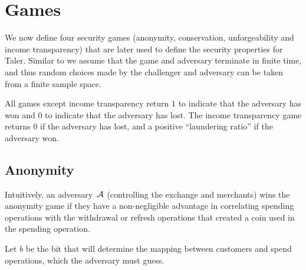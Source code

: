 %
%
%

\section{Games}

We now define four security games (anonymity, conservation, unforgeability and
income transparency) that are later used to define the security properties for
Taler.  Similar to \cite{bellare2006code} we assume that the game and adversary
terminate in finite time, and thus random choices made by the challenger and
adversary can be taken from a finite sample space.

All games except income transparency return $1$ to indicate that the adversary
has won and $0$ to indicate that the adversary has lost.  The income
transparency game returns $0$ if the adversary has lost, and a positive
``laundering ratio'' if the adversary won.

\subsection{Anonymity}
Intuitively, an adversary~$\mathcal{A}$ (controlling the exchange and merchants) wins the
anonymity game if they have a non-negligible advantage in correlating spending operations
with the withdrawal or refresh operations that created a coin used in the
spending operation.

Let $b$ be the bit that will determine the mapping between customers and spend
operations, which the adversary must guess.

